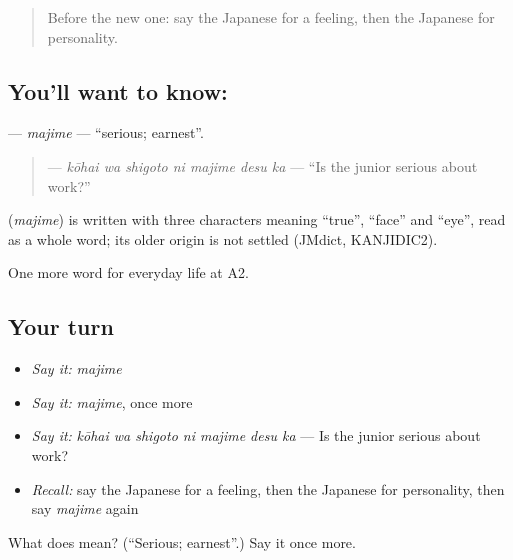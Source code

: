 \begin{quote}
Before the new one: say the Japanese for a feeling, then the Japanese for personality.
\end{quote}

\subsection*{You'll want to know: }
\textbf{} — \emph{majime} — \textquotedblleft{}serious; earnest\textquotedblright{}.

\begin{quote}
\textbf{  } — \emph{kōhai wa shigoto ni majime desu ka} — \textquotedblleft{}Is the junior serious about work?\textquotedblright{}
\end{quote}

\begin{cousinweb}
\textbf{} (\emph{majime}) is written with three characters meaning \textquotedblleft{}true\textquotedblright{}, \textquotedblleft{}face\textquotedblright{} and \textquotedblleft{}eye\textquotedblright{}, read as a whole word; its older origin is not settled (JMdict, KANJIDIC2).
\end{cousinweb}

\begin{grammarlens}[title={What you've built}]
One more word for everyday life at A2.
\end{grammarlens}

\subsection*{Your turn}
\begin{itemize}
\raggedright
  \item \emph{Say it:} \emph{majime}
  \item \emph{Say it:} \emph{majime}, once more
  \item \emph{Say it:} \emph{kōhai wa shigoto ni majime desu ka} — Is the junior serious about work?
  \item \emph{Recall:} say the Japanese for a feeling, then the Japanese for personality, then say \emph{majime} again
\end{itemize}

\begin{tcolorbox}[breakable,colback=teal!4,colframe=teal!35!black,title={Before you move on}]
What does  mean? (\textquotedblleft{}Serious; earnest\textquotedblright{}.) Say it once more.
\end{tcolorbox}
